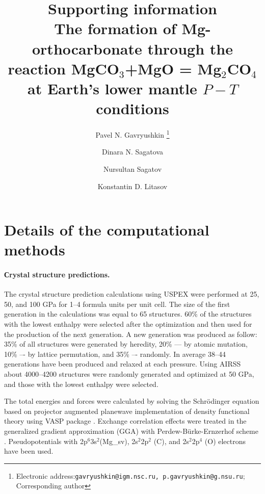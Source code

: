 \documentclass[a4paperm]{article}
\begin{document}

\title{{\bf Supporting information} \\ \bigskip
The formation of Mg-orthocarbonate through the reaction MgCO$_3$+MgO = Mg$_2$CO$_4$ at Earth's lower mantle $P-T$ conditions}


\author[1,2]{Pavel N. Gavryushkin
   \thanks{Electronic address:\texttt{gavryushkin@igm.nsc.ru, p.gavryushkin@g.nsu.ru}; Corresponding author}}     
\author[1,2]{Dinara N. Sagatova}
\author[1]{Nursultan Sagatov}
\author[3]{Konstantin D. Litasov}


\date{}
\maketitle


\section*{Details of the computational methods}
\paragraph{Сrystal structure predictions.}
The crystal structure prediction calculations using USPEX were performed at 25, 50, and 100 GPa for 1--4 formula units per unit cell.
The size of the first generation in the calculations was equal to 65 structures.
60\% of the structures with the lowest enthalpy were selected after the optimization and then used for the production of the next generation.
A new generation was produced as follow: 35\% of all structures were generated by heredity, 20\% --- by atomic mutation, 10\% –- by lattice permutation, and 35\% –- randomly.
In average 38--44 generations have been produced and relaxed at each pressure.
Using AIRSS about 4000--4200 structures were randomly generated and optimized at 50 GPa, and those with the lowest enthalpy were selected.

The total energies and forces were calculated by solving the Schr\"{o}dinger equation based on projector augmented planewave implementation of density functional theory using VASP package \cite{vasp1,vasp2}.
Exchange correlation effects were treated in the generalized gradient approximation (GGA) with Perdew-B\"{u}rke-Ernzerhof scheme \cite{pbe}.
Pseudopotentials with 2p$^6$3s$^2$(Mg\_sv), 2s$^2$2p$^2$ (C), and 2s$^2$2p$^4$ (O) electrons have been used.
\end{document}
